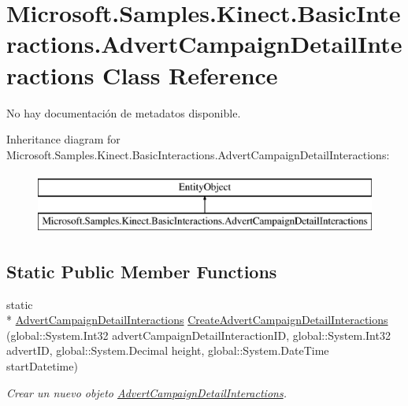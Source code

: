 \hypertarget{class_microsoft_1_1_samples_1_1_kinect_1_1_basic_interactions_1_1_advert_campaign_detail_interactions}{\section{Microsoft.\-Samples.\-Kinect.\-Basic\-Interactions.\-Advert\-Campaign\-Detail\-Interactions Class Reference}
\label{class_microsoft_1_1_samples_1_1_kinect_1_1_basic_interactions_1_1_advert_campaign_detail_interactions}
}


No hay documentación de metadatos disponible.  


Inheritance diagram for Microsoft.\-Samples.\-Kinect.\-Basic\-Interactions.\-Advert\-Campaign\-Detail\-Interactions\-:\begin{figure}[H]
\begin{center}
\leavevmode
\includegraphics[height=2.000000cm]{class_microsoft_1_1_samples_1_1_kinect_1_1_basic_interactions_1_1_advert_campaign_detail_interactions}
\end{center}
\end{figure}
\subsection*{Static Public Member Functions}
\begin{DoxyCompactItemize}
\item 
static \\*
\hyperlink{class_microsoft_1_1_samples_1_1_kinect_1_1_basic_interactions_1_1_advert_campaign_detail_interactions}{Advert\-Campaign\-Detail\-Interactions} \hyperlink{class_microsoft_1_1_samples_1_1_kinect_1_1_basic_interactions_1_1_advert_campaign_detail_interactions_a823e1af528af17efe60732c19e529c1d}{Create\-Advert\-Campaign\-Detail\-Interactions} (global\-::\-System.\-Int32 advert\-Campaign\-Detail\-Interaction\-I\-D, global\-::\-System.\-Int32 advert\-I\-D, global\-::\-System.\-Decimal height, global\-::\-System.\-Date\-Time start\-Datetime)
\begin{DoxyCompactList}\small\item\em Crear un nuevo objeto \hyperlink{class_microsoft_1_1_samples_1_1_kinect_1_1_basic_interactions_1_1_advert_campaign_detail_interactions}{Advert\-Campaign\-Detail\-Interactions}. \end{DoxyCompactList}\end{DoxyCompactItemize}
